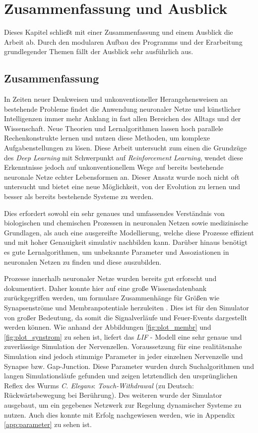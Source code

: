 %
\chapter{Zusammenfassung und Ausblick}
\label{chap:zsm}
%
	Dieses Kapitel schließt mit einer Zusammenfassung und einem Ausblick die Arbeit ab. Durch den modularen Aufbau des Programms und der Erarbeitung grundlegender Themen fällt der Ausblick sehr ausführlich aus.

\section{Zusammenfassung}
\label{sec:erg_zsm}
	In Zeiten neuer Denkweisen und unkonventioneller Herangehensweisen an bestehende Probleme findet die Anwendung neuronaler Netze und künstlicher Intelligenzen immer mehr Anklang in fast allen Bereichen des Alltags und der Wissenschaft. Neue Theorien und Lernalgorithmen lassen hoch parallele Rechenkonstrukte lernen und nutzen diese Methoden, um komplexe Aufgabenstellungen zu lösen. Diese Arbeit untersucht zum einen die Grundzüge des \textit{Deep Learning} mit Schwerpunkt auf \textit{Reinforcement Learning}, wendet diese Erkenntnisse jedoch auf unkonventionellem Wege auf bereits bestehende neuronale Netze echter Lebensformen an. Dieser Ansatz wurde noch nicht oft untersucht und bietet eine neue Möglichkeit, von der Evolution zu lernen und besser als bereits bestehende Systeme zu werden.
	
	Dies erfordert sowohl ein sehr genaues und umfassendes Verständnis von biologischen und chemischen Prozessen in neuronalen Netzen sowie medizinische Grundlagen, als auch eine ausgereifte Modellierung, welche diese Prozesse effizient und mit hoher Genauigkeit simulativ nachbilden kann. Darüber hinaus benötigt es gute Lernalgorithmen, um unbekannte Parameter und Assoziationen in neuronalen Netzen zu finden und diese auszubilden.
	
	Prozesse innerhalb neuronaler Netze wurden bereits gut erforscht und dokumentiert. Daher konnte hier auf eine große Wissensdatenbank zurückgegriffen werden, um formulare Zusammenhänge für Größen wie Synapsenströme und Membranpotentiale herzuleiten \cite{NeuronalDynamics}. Dies ist für den Simulator von großer Bedeutung, da somit die Signalverläufe und Feuer-Events dargestellt werden können. Wie anhand der Abbildungen \ref{fig:plot_membr} und \ref{fig:plot_synstrom} zu sehen ist, liefert das \textit{LIF} - Modell eine sehr genaue und zuverlässige Simulation der Nervenzellen. Voraussetzung für eine realitätsnahe Simulation sind jedoch stimmige Parameter in jeder einzelnen Nervenzelle und Synapse bzw. Gap-Junction. Diese Parameter wurden durch Suchalgorithmen und langen Simulationsläufe gefunden und zeigen letztendlich den ursprünglichen Reflex des Wurms \textit{C. Elegans}: \textit{Touch-Withdrawal} (zu Deutsch: Rückwärtsbewegung bei Berührung). Des weiteren wurde der Simulator ausgebaut, um ein gegebenes Netzwerk zur Regelung dynamischer Systeme zu nutzen. Auch dies konnte mit Erfolg nachgewiesen werden, wie in Appendix \ref{app:parameter} zu sehen ist.
	
